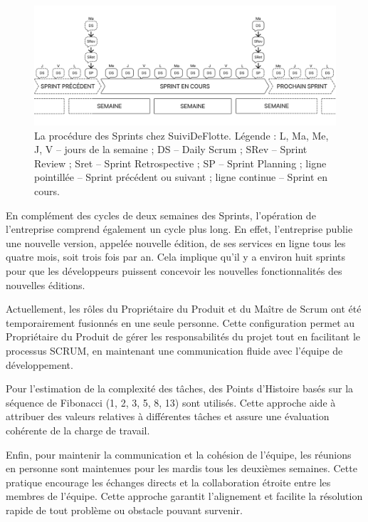 \begin{figure}[h]
    \centering
    \includegraphics[width=\textwidth]{img/sprint04}
    \caption{La procédure des Sprints chez SuiviDeFlotte. Légende : L, Ma, Me, J, V -- jours de la semaine ; DS -- Daily Scrum ; SRev -- Sprint Review ; Sret -- Sprint Retrospective ; SP -- Sprint Planning ; ligne pointillée -- Sprint précédent ou suivant ; ligne continue -- Sprint en cours.}
    \label{fig:sprint}
\end{figure}

En complément des cycles de deux semaines des Sprints, l'opération de l'entreprise comprend également un cycle plus long. En effet, l'entreprise publie une nouvelle version, appelée nouvelle édition, de ses services en ligne tous les quatre mois, soit trois fois par an. Cela implique qu'il y a environ huit sprints pour que les développeurs puissent concevoir les nouvelles fonctionnalités des nouvelles éditions.

Actuellement, les rôles du Propriétaire du Produit et du Maître de Scrum ont été temporairement fusionnés en une seule personne. Cette configuration permet au Propriétaire du Produit de gérer les responsabilités du projet tout en facilitant le processus SCRUM, en maintenant une communication fluide avec l'équipe de développement.

Pour l'estimation de la complexité des tâches, des Points d'Histoire basés sur la séquence de Fibonacci (1, 2, 3, 5, 8, 13) sont utilisés. Cette approche aide à attribuer des valeurs relatives à différentes tâches et assure une évaluation cohérente de la charge de travail.

Enfin, pour maintenir la communication et la cohésion de l'équipe, les réunions en personne sont maintenues pour les mardis tous les deuxièmes semaines. Cette pratique encourage les échanges directs et la collaboration étroite entre les membres de l'équipe. Cette approche garantit l'alignement et facilite la résolution rapide de tout problème ou obstacle pouvant survenir.